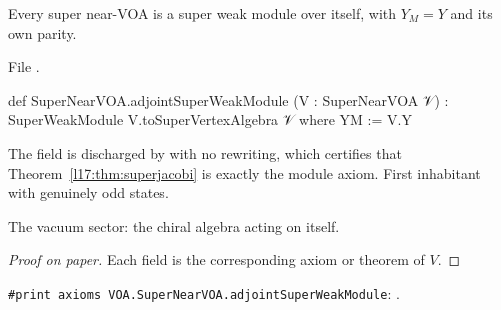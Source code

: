 \begin{proposition}\label{l17:prop:adjoint}
Every super near-VOA is a super weak module over itself, with $Y_M=Y$ and its own parity.
\end{proposition}
\noindent File .
\begin{leancode}
def SuperNearVOA.adjointSuperWeakModule (V : SuperNearVOA 𝒱) :
    SuperWeakModule V.toSuperVertexAlgebra 𝒱 where
  YM := V.Y
\end{leancode}
\begin{dictionary}
The  field is discharged by  with no rewriting, which certifies that
Theorem~\ref{l17:thm:superjacobi} is exactly the module axiom. First inhabitant with genuinely odd
states.
\end{dictionary}
\begin{physics}
The vacuum sector: the chiral algebra acting on itself.
\end{physics}
\begin{proof}[Proof on paper]
Each field is the corresponding axiom or theorem of $V$.
\end{proof}
\begin{status}
\texttt{\#print axioms VOA.SuperNearVOA.adjointSuperWeakModule}: .
\end{status}

